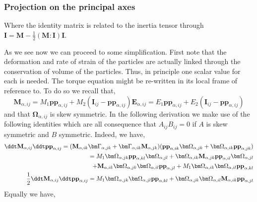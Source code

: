 \subsubsection*{Projection on the principal axes}


Where the identity matrix is related to the inertia tensor through $\textbf{I} = \textbf{M} - \frac{1}{2}(\textbf{M}:\textbf{I})\textbf{I}$. 

As we see now we can proceed to some simplification. 
First note that the deformation and rate of strain of the particles are actually linked through the conservation of volume of the particles. 
Thus, in principle one scalar value for each is needed. 
The torque equation might be re-written in its local frame of reference to. 
To do so we recall that, 
\begin{equation*}
    \textbf{M}_{\alpha,ij} 
    = M_1 \textbf{pp}_{\alpha,ij}
    + M_2 (\textbf{I}_{ij} - \textbf{pp}_{\alpha,ij})
    \textbf{E}_{\alpha,ij} 
    = E_1 \textbf{pp}_{\alpha,ij}
    + E_2 (\textbf{I}_{ij} - \textbf{pp}_{\alpha,ij})
\end{equation*}
and that $\bm\Omega_{\alpha,ij}$ is skew symmetric. 
In the following derivation we make use of the following identities which are all consequence that $A_{ij}B_{ij} = 0$ if $A$ is skew symmetric and $B$ symmetric. 
Indeed, we have, 
\begin{align*}
    \ddt \textbf{M}_{\alpha,ij}
    \ddt \textbf{pp}_{\alpha,ij}
    = 
    (\textbf{M}_{\alpha,ik}  \bm\Gamma_{\alpha,jk}
    +  \bm\Gamma_{\alpha,ik}  \textbf{M}_{\alpha,jk})
    (\textbf{pp}_{\alpha,ik}  \bm\Omega_{\alpha,jk}
    +  \bm\Omega_{\alpha,ik}  \textbf{pp}_{\alpha,jk})\\
    = 
    M_1  \bm\Omega_{\alpha,jk}
    \textbf{pp}_{\alpha,kl}  \bm\Omega_{\alpha,jl}
    +  \bm\Omega_{\alpha,ik}  \textbf{M}_{\alpha,jk}
    \textbf{pp}_{\alpha,il}  \bm\Omega_{\alpha,jl} \\
    + \textbf{M}_{\alpha,ik}  \bm\Omega_{\alpha,jk}
    \bm\Omega_{\alpha,il}  \textbf{pp}_{\alpha,jl}
    + M_1  \bm\Omega_{\alpha,ik}  
    \bm\Omega_{\alpha,il}  \textbf{pp}_{\alpha,kl}\\
    \frac{1}{2}\ddt \textbf{M}_{\alpha,ij}
    \ddt \textbf{pp}_{\alpha,ij}
    = 
     M_1  
     \bm\Omega_{\alpha,jk}
     \bm\Omega_{\alpha,jl}
    \textbf{pp}_{\alpha,kl}  
    +   
    \bm\Omega_{\alpha,jk}  
    \bm\Omega_{\alpha,il} 
    \textbf{M}_{\alpha,ik}
    \textbf{pp}_{\alpha,jl}  
\end{align*}
Equally we have, 
